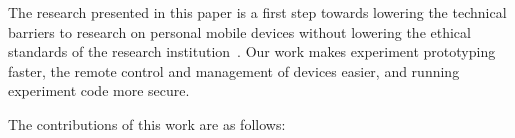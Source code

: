 %
%
%
			
The research presented in this paper is a first step towards lowering the technical
barriers to research on personal mobile devices without lowering the
ethical standards of the research institution~\cite{zevenbergen2013ethical}. 
%
%
Our work makes experiment
prototyping faster, the remote control and management of devices
easier, and running experiment code more secure. 

The contributions of this work are as follows:

